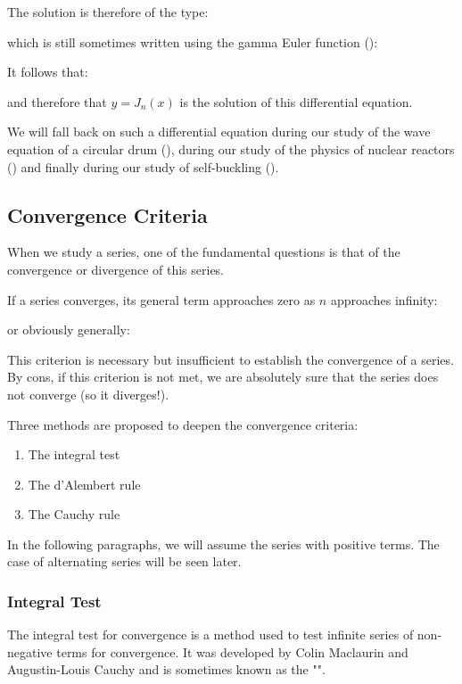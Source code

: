 	The solution is therefore of the type:
	
	which is still sometimes written using the gamma Euler function ():
	
	It follows that:
	
	and therefore that $y=J_n(x)$ is the solution of this differential equation.
	
	We will fall back on such a differential equation during our study of the wave equation of a circular drum (), during our study of the physics of nuclear reactors () and finally during our study of self-buckling ().
	
	\subsection{Convergence Criteria}
	When we study a series, one of the fundamental questions is that of the convergence or divergence of this series.
	
	If a series converges, its general term approaches zero as $n$ approaches infinity:
	
	or obviously generally:
	
	This criterion is necessary but insufficient to establish the convergence of a series. By cons, if this criterion is not met, we are absolutely sure that the series does not converge (so it diverges!).
	
	Three methods are proposed to deepen the convergence criteria:
	\begin{enumerate}
		\item The integral test

		\item The d'Alembert rule

		\item The Cauchy rule
	\end{enumerate}
	In the following paragraphs, we will assume the series with positive terms. The case of alternating series will be seen later.
	
	\subsubsection{Integral Test}
	The integral test for convergence is a method used to test infinite series of non-negative terms for convergence. It was developed by Colin Maclaurin and Augustin-Louis Cauchy and is sometimes known as the "".
	
